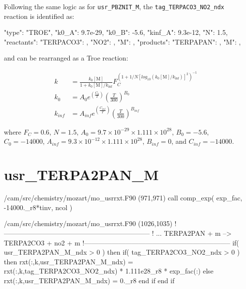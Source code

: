 \documentclass[titlepage]{article}
\begin{document}
Following the same logic as for \verb>usr_PBZNIT_M>, the \verb>tag_TERPACO3_NO2_ndx> reaction is identified as:

\begin{blockcode}
        {
          "type": "TROE",
          "k0_A": 9.7e-29,
          "k0_B": -5.6,
          "kinf_A": 9.3e-12,
          "N": 1.5,
          "reactants": {
            "TERPACO3": { },
            "NO2": { },
            "M": { }
          },
          "products": {
            "TERPAPAN": { },
            "M": { }
          }
        },
\end{blockcode}

\noindent and can be rearranged as a Troe reaction:

\begin{equation}
\begin{split}
k & = \frac{k_0[\mbox{M}]}{1+k_0[\mbox{M}]/k_{\inf}}F_C^{(1+1/N[log_{10}(k_0[\mbox{M}]/k_{\inf})]^2)^{-1}} \\
k_0 & = A_0 e^{\left( \frac{C_0}{T} \right)} \left( \frac{T}{300} \right)^{B_0} \\
k_{inf} & = A_{inf} e^{\left( \frac{C_{inf}}{T} \right)} \left( \frac{T}{300} \right)^{B_{inf}}
\end{split}
\end{equation}

\noindent where $F_C = 0.6$, $N = 1.5$, $A_0 = 9.7 \times 10^{-29} \times 1.111 \times 10^{28}$, $B_0 = -5.6$, $C_0 = -14000$, $A_{inf} = 9.3 \times 10^{-12} \times 1.111 \times 10^{28}$, $B_{inf} = 0$, and $C_{inf} = -14000$.


\section{usr\_TERPA2PAN\_M}

\begin{blockcode}[commandchars=\\\{\}]
\color{gray}/cam/src/chemistry/mozart/mo_usrrxt.F90 (971,971)
       call comp_exp( exp_fac, -14000._r8*tinv, ncol )
\end{blockcode}

\begin{blockcode}[commandchars=\\\{\}]
\color{gray}/cam/src/chemistry/mozart/mo_usrrxt.F90 (1026,1035)
!-----------------------------------------------------------------
!       ... TERPA2PAN + m --> TERPA2CO3 + no2 + m
!-----------------------------------------------------------------
       if( usr_TERPA2PAN_M_ndx > 0 ) then
          if( tag_TERPA2CO3_NO2_ndx > 0 ) then
             rxt(:,k,usr_TERPA2PAN_M_ndx) = rxt(:,k,tag_TERPA2CO3_NO2_ndx) * 1.111e28_r8 * exp_fac(:)
          else
             rxt(:,k,usr_TERPA2PAN_M_ndx) = 0._r8
          end if
       end if
\end{blockcode}
\end{document}
